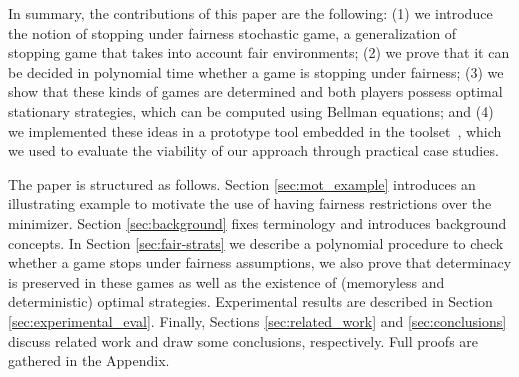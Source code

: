 In summary,  the contributions of this paper are the following: (1) we introduce  the notion of stopping under fairness stochastic game, a generalization of stopping game that takes into account fair environments; (2) we prove that it can be decided in polynomial time whether a game is stopping under fairness; (3) we show that  these kinds of games are determined and both players possess optimal stationary strategies,  which can be computed using Bellman equations; and (4) we implemented these ideas in a prototype tool embedded in the {\PrismGames} toolset~\cite{DBLP:conf/cav/KwiatkowskaN0S20}, which we used to evaluate the viability of our approach through practical case studies.


The paper is structured as follows. Section \ref{sec:mot_example} introduces an illustrating example to motivate the use of having fairness restrictions over the minimizer.  Section \ref{sec:background} fixes terminology and introduces background concepts. 
In Section \ref{sec:fair-strats} we describe a polynomial procedure to check whether a game stops under fairness assumptions, 
we also prove that determinacy is preserved in these games as well as the existence of (memoryless and deterministic) optimal strategies. 
Experimental results are described in Section \ref{sec:experimental_eval}. 
Finally, Sections \ref{sec:related_work} and  \ref{sec:conclusions} discuss related work and draw some conclusions, respectively.  Full proofs are gathered in the Appendix.




